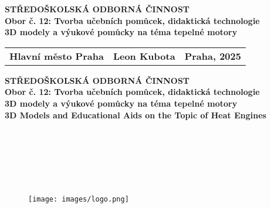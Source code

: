 
\pagestyle{empty}
{\centering
\fontsize{18}{0}\textbf{STŘEDOŠKOLSKÁ ODBORNÁ ČINNOST}\\
\vspace{0.25cm}
\fontsize{14}{0}\textbf{Obor č. 12: Tvorba učebních pomůcek, didaktická technologie}\\
\vspace{8cm}
\fontsize{20}{0}\textbf{3D modely a výukové pomůcky na téma tepelné motory}\\
\vfill{}

\begin{tabularx}{1\textwidth} { 
    >{\raggedright\arraybackslash}X 
    >{\centering\arraybackslash}X 
    >{\raggedleft\arraybackslash}X}
    \fontsize{16}{0}\textbf{Hlavní město Praha} & 
    \fontsize{16}{0}\textbf{Leon Kubota} & 
    \fontsize{16}{0}\textbf{Praha, 2025}
\end{tabularx}}

\newpage
{\centering
\fontsize{18}{0}\textbf{STŘEDOŠKOLSKÁ ODBORNÁ ČINNOST}\\
\vspace{0.25cm}
\fontsize{14}{0}\textbf{Obor č. 12: Tvorba učebních pomůcek, didaktická technologie}\\
\vspace{7.5cm}
\fontsize{20}{0}\textbf{3D modely a výukové pomůcky na téma tepelné motory}\\
\vspace{1.5cm}
\fontsize{20}{0}\textbf{3D Models and Educational Aids on the Topic of Heat Engines}\\
\vspace{0.25cm}
\vfill{}
\begin{minipage}{0.8\textwidth}
      \begin{flushleft}
        \fontsize{16}{20}\\
        \fontsize{16}{20}\\
        \fontsize{16}{20}\\
        \fontsize{16}{20}\\
        \fontsize{12}{20}\selectfont{Praha, 2025}\\
    \end{flushleft}
\end{minipage}%
\begin{minipage}{0.2\textwidth}
    \begin{figure}[H]
        \texttt{[image: images/logo.png]}
    \end{figure}
\end{minipage}
}

